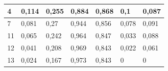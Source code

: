\documentclass{classrep}
\begin{document}
{\begin{table}[H]
\begin{center}
\begin{tabular}{|l|l|l|l|l|l|l|}
4                                                                  & 0,114                                                                  & 0,255                                                                     & 0,884                                                         & 0,868                                                            & 0,1                                                              & 0,087                                                               \\ \hline
7                                                                  & 0,081                                                                  & 0,27                                                                      & 0,944                                                         & 0,856                                                            & 0,078                                                            & 0,091                                                               \\ \hline
11                                                                 & 0,065                                                                  & 0,242                                                                     & 0,964                                                         & 0,847                                                            & 0,033                                                            & 0,088                                                               \\ \hline
12                                                                 & 0,041                                                                  & 0,208                                                                     & 0,969                                                         & 0,843                                                            & 0,022                                                            & 0,061                                                               \\ \hline
13                                                                 & 0,024                                                                  & 0,167                                                                     & 0,973                                                         & 0,843                                                            & 0                                                                & 0                                                                   \\ \hline

\end{tabular}
\end{center}
\end{table}}
\end{document}
